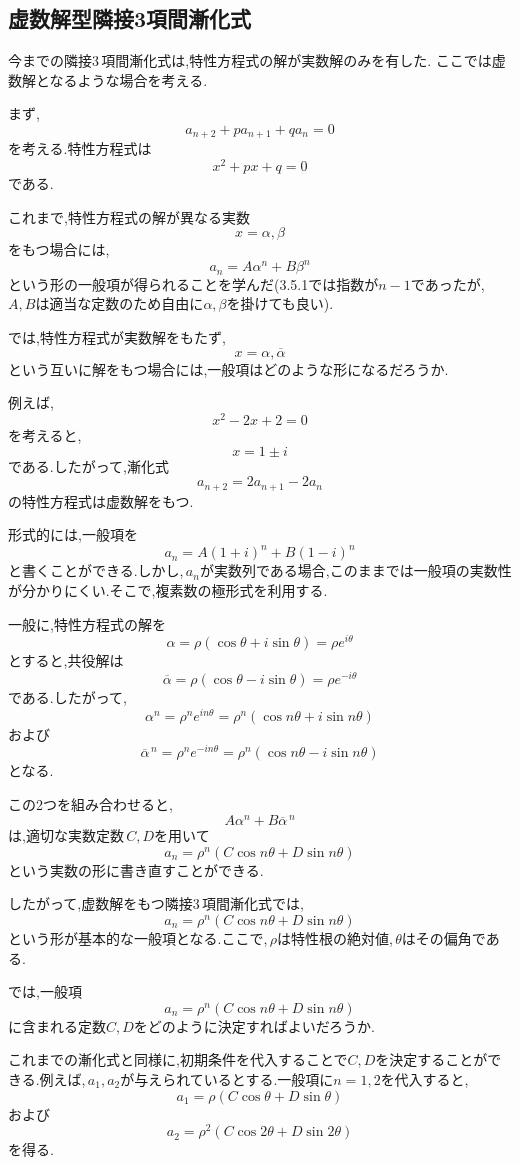 \subsection{虚数解型隣接3項間漸化式}
  今までの隣接3\,項間漸化式は,特性方程式の解が実数解のみを有した.
  ここでは虚数解となるような場合を考える.

  まず,
  \[
    a_{n+2}+pa_{n+1}+qa_n=0
  \]
  を考える.特性方程式は
  \[
    x^2+px+q=0
  \]
  である.

  これまで,特性方程式の解が異なる実数
  \[
    x=\alpha,\beta
  \]
  をもつ場合には,
  \[
    a_n=A\alpha^n+B\beta^n
  \]
  という形の一般項が得られることを学んだ(3.5.1では指数が$n-1$であったが,\,$A,B$は適当な定数のため自由に$\alpha,\beta$を掛けても良い).

  では,特性方程式が実数解をもたず,
  \[
    x=\alpha,\overline{\alpha}
  \]
  という互いに解をもつ場合には,一般項はどのような形になるだろうか.

  例えば,
  \[
    x^2-2x+2=0
  \]
  を考えると,
  \[
    x=1\pm i
  \]
  である.したがって,漸化式
  \[
    a_{n+2}=2a_{n+1}-2a_n
  \]
  の特性方程式は虚数解をもつ.

  形式的には,一般項を
  \[
    a_n=A(1+i)^n+B(1-i)^n
  \]
  と書くことができる.しかし,\,$a_n$が実数列である場合,このままでは一般項の実数性が分かりにくい.そこで,複素数の極形式を利用する.

  一般に,特性方程式の解を
  \[
    \alpha=\rho(\cos\theta+i\sin\theta)=\rho e^{i\theta}
  \]
  とすると,共役解は
  \[
    \overline{\alpha}=\rho(\cos\theta-i\sin\theta)=\rho e^{-i\theta}
  \]
  である.したがって,
  \[
    \alpha^n=\rho^n e^{in\theta}
    =\rho^n(\cos n\theta+i\sin n\theta)
  \]
  および
  \[
    \overline{\alpha}^{\,n}
    =\rho^n e^{-in\theta}
    =\rho^n(\cos n\theta-i\sin n\theta)
  \]
  となる.

  この2つを組み合わせると,
  \[
    A\alpha^n+B\overline{\alpha}^{\,n}
  \]
  は,適切な実数定数\,$C,D$を用いて
  \[
    a_n=\rho^n(C\cos n\theta+D\sin n\theta)
  \]
  という実数の形に書き直すことができる.

  したがって,虚数解をもつ隣接3\,項間漸化式では,
  \[
    a_n=\rho^n(C\cos n\theta+D\sin n\theta)
  \]
  という形が基本的な一般項となる.ここで,\,$\rho$は特性根の絶対値,\,$\theta$はその偏角である.

  では,一般項
  \[
    a_n=\rho^n(C\cos n\theta+D\sin n\theta)
  \]
  に含まれる定数$C,D$をどのように決定すればよいだろうか.

  これまでの漸化式と同様に,初期条件を代入することで$C,D$を決定することができる.例えば,\,$a_1,a_2$が与えられているとする.一般項に$n=1,2$を代入すると,
  \[
    a_1=\rho(C\cos\theta+D\sin\theta)
  \]
  および
  \[
    a_2=\rho^2(C\cos2\theta+D\sin2\theta)
  \]
  を得る.

